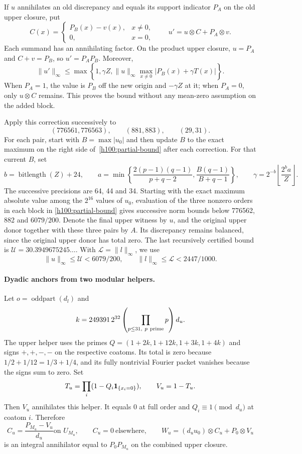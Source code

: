 If $u$ annihilates an old discrepancy and equals its support indicator
$P_A$ on the old upper closure, put
\[
 C(x)=\begin{cases}P_B(x)-v(x),&x\ne0,\\0,&x=0,\end{cases}
 \qquad
 u'=u\otimes C+P_A\otimes v.
\]
Each summand has an annihilating factor.  On the product upper closure,
$u=P_A$ and $C+v=P_B$, so $u'=P_AP_B$.  Moreover,
\begin{equation}\label{h100:partial-bound}
 \|u'\|_\infty\le
 \max\left\{1,\gamma Z,
   \|u\|_\infty\max_{x\ne0}|P_B(x)+\gamma T(x)|\right\}.
\end{equation}
When $P_A=1$, the value is $P_B$ off the new origin and $-\gamma Z$
at it; when $P_A=0$, only $u\otimes C$ remains.  This proves the bound
without any mean-zero assumption on the added block.

Apply this correction successively to
\[
 (776561,776563),\qquad(881,883),\qquad(29,31).
\]
For each pair, start with $B=\max|u_0|$ and then update $B$ to the
exact maximum on the right side of~\eqref{h100:partial-bound} after
each correction. For that current $B$, set
\[
 b=\operatorname{bitlength}(Z)+24,\qquad
 a=\min\left\{\frac{2(p-1)(q-1)}{p+q-2},
              \frac{B(q-1)}{B+q-1}\right\},\qquad
 \gamma=2^{-b}\left\lfloor\frac{2^b a}{Z}\right\rfloor.
\]
The successive precisions are 64, 44 and 34.  Starting with the exact
maximum absolute value among the $2^{16}$ values of $u_0$, evaluation of the three
nonzero orders in each block in \eqref{h100:partial-bound} gives successive
norm bounds below 776562, 882 and $6079/200$.  Denote the final upper witness
by $u$, and the original upper donor together with these three pairs by
$A$.  Its discrepancy remains balanced, since the original upper donor
has total zero.  The last recursively certified bound is
$\mathcal U=30.3949675245\ldots$.  With $\mathcal L=\|l\|_\infty$, we use
\begin{equation}\label{h100:individual-bounds}
 \|u\|_\infty\le\mathcal U<6079/200,\qquad
 \|l\|_\infty\le\mathcal L<2447/1000.
\end{equation}

\paragraph{Dyadic anchors from two modular helpers.}
Let $o=\operatorname{oddpart}(d_l)$ and
\[
 k=249391\,2^{32}\left(\prod_{p\le31,\ p\ {\rm prime}}p\right)d_u.
\]
The upper helper uses the primes
$Q=(1+2k,1+12k,1+3k,1+4k)$ and signs $+,+,-,-$ on the respective
coatoms.  Its total is zero because
$1/2+1/12=1/3+1/4$, and its fully nontrivial Fourier packet vanishes
because the signs sum to zero.  Set
\[
 T_u=\prod_i(1-Q_i\mathbf1_{\{x_i=0\}}),\qquad V_u=1-T_u.
\]
Then $V_u$ annihilates this helper.  It equals 0 at full order and
$Q_i\equiv1\pmod {d_u}$ at coatom $i$.  Therefore
\[
 C_u=\frac{P_{M_u}-V_u}{d_u} \text{on }U_{M_u},\qquad C_u=0
 \ \text{elsewhere},\qquad
 W_u=(d_u u_0)\otimes C_u+P_0\otimes V_u
\]
is an integral annihilator equal to $P_0P_{M_u}$ on the combined upper
closure.

